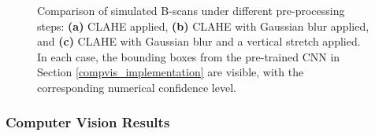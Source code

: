 \begin{figure}[htbp]
\begin{subfigure}[b]{0.32\textwidth}
        \caption{ }
        \label{fig:sim_bscan_c}
      \end{subfigure}
      
      \caption[Comparison of simulated B-scans under different pre-processing steps]{Comparison of simulated B-scans under different pre-processing steps: \textbf{(a)} CLAHE applied, \textbf{(b)} CLAHE with Gaussian blur applied, and \textbf{(c)} CLAHE with Gaussian blur and a vertical stretch applied. In each case, the bounding boxes from the pre-trained CNN in Section \ref{compvis_implementation} are visible, with the corresponding numerical confidence level.}
      \label{fig:sim_bscan_comparison}
    \end{figure}
        
    
    \subsubsection{Computer Vision Results}
    
